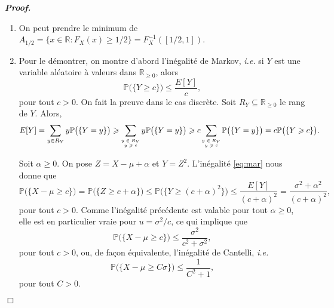 \documentclass[11pt,a4paper]{article}
\newcommand{\RR}{\mathbb{R}}
\newenvironment{preuve}[1][]
{\vskip 2mm  \noindent\emph{\bf Proof#1. }}{$\Box$ \vskip 2mm}
\let\geq\geqslant
\let\leq\leqslant
\begin{document}
\begin{preuve}
\begin{enumerate}
				\item On peut prendre le minimum de $A_{1/2} = \{ x \in \RR : F_{X}(x) \geq 1/2 \} = F_{X}^{-1}([1/2,1])$. 
				
				\item Pour le démontrer, on montre d'abord l'inégalité de Markov, \textit{i.e.} si $Y$ est une variable aléatoire à valeurs dans $\RR_{\geq 0}$, alors 
				\begin{equation}
				\tag{Mar}
				\label{eq:mar}
				\mathbb{P}\big( \{ Y \geq c\} \big) \leq \frac{E[Y]}{c},
				\end{equation}
				pour tout $c > 0$. 
				On fait la preuve dans le cas discrète. 
				Soit $R_{Y} \subseteq \RR_{\geq 0}$ le rang de $Y$. 
				Alors,
				\[     E[Y] = \sum_{y \in R_{Y}} y \mathbb{P}\big( \{ Y = y \} \big) \geq \sum_{\text{\begin{tiny}$\begin{matrix}y \in R_{Y}\\y \geq c\end{matrix}$\end{tiny}}} y \mathbb{P}\big( \{ Y = y \} \big) \geq  c \sum_{\text{\begin{tiny}$\begin{matrix}y \in R_{Y}\\y \geq c\end{matrix}$\end{tiny}}} \mathbb{P}\big( \{ Y = y \} \big) = c \mathbb{P}\big( \{ Y \geq c \} \big).     \]
				
				Soit $\alpha \geq 0$. 
				On pose $Z = X - \mu + \alpha$ et $Y = Z^{2}$. 
				L'inégalité \eqref{eq:mar} nous donne que 
				\[     \mathbb{P}\big( \{ X - \mu \geq c \} \big) = \mathbb{P}\big( \{ Z \geq c + \alpha \} \big) \leq \mathbb{P}\big( \{ Y \geq (c+\alpha)^{2} \} \big)  \leq \frac{E[Y]}{(c+\alpha)^{2}} = \frac{\sigma^{2}+\alpha^{2}}{(c+\alpha)^{2}},     \]
				pour tout $c > 0$. 
				Comme l'inégalité précédente est valable pour tout $\alpha \geq 0$, elle est en particulier vraie pour $u = \sigma^{2}/c$, ce qui implique que 
				\[     \mathbb{P}\big( \{ X - \mu \geq c \} \big) \leq \frac{\sigma^{2}}{c^{2}+\sigma^{2}},     \]
				pour tout $c > 0$, ou, de façon équivalente, l'inégalité de Cantelli, \textit{i.e.}
				\begin{equation}
				\tag{Can}
				\label{eq:cant}
				\mathbb{P}\big( \{ X - \mu \geq C \sigma \} \big) \leq \frac{1}{C^{2}+1},     
				\end{equation}
				pour tout $C > 0$. 
				

\end{enumerate}
\end{preuve}
\end{document}
